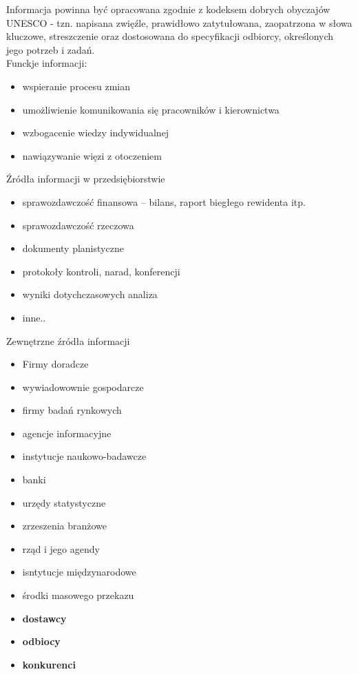 \documentclass[a4paper,10pt]{report}
\begin{document}
Informacja powinna być opracowana zgodnie z kodeksem dobrych obyczajów UNESCO - tzn. napisana zwięźle, prawidłowo zatytułowana, zaopatrzona w słowa kluczowe, streszczenie oraz dostosowana do specyfikacji odbiorcy, określonych jego potrzeb i zadań.\\

\noindent Funckje informacji:
\begin{itemize}
	\item wspieranie procesu zmian
	\item umożliwienie komunikowania się pracowników i kierownictwa
	\item wzbogacenie wiedzy indywidualnej
	\item nawiązywanie więzi z otoczeniem
\end{itemize}

\noindent Źródła informacji w przedsiębiorstwie
\begin{itemize}
	\item sprawozdawczość finansowa -- bilans, raport biegłego rewidenta itp.
	\item sprawozdawczość rzeczowa
	\item dokumenty planistyczne
	\item protokoły kontroli, narad, konferencji
	\item wyniki dotychczasowych analiza
	\item inne..
\end{itemize}

\noindent Zewnętrzne źródła informacji
\begin{itemize}
	\item Firmy doradcze
	\item wywiadowownie gospodarcze
	\item firmy badań rynkowych
	\item agencje informacyjne
	\item instytucje naukowo-badawcze
	\item banki
	\item urzędy statystyczne
	\item zrzeszenia branżowe
	\item rząd i jego agendy
	\item isntytucje międzynarodowe
	\item środki masowego przekazu
	\item \textbf{dostawcy}
	\item \textbf{odbiocy}
	\item \textbf{konkurenci}
\end{itemize}
\end{document}
